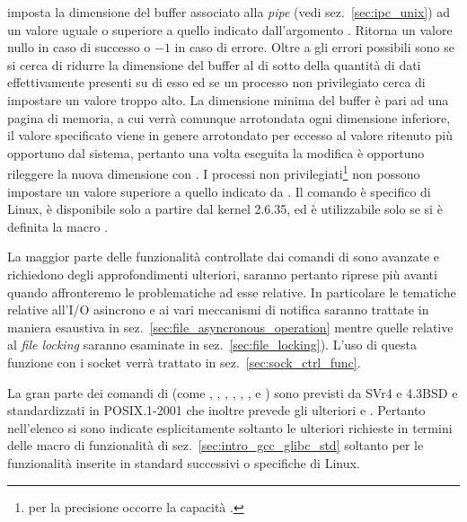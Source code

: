 \begin{basedescript}{\desclabelwidth{1.8cm}}
\item[\constd{F\_SETPIPE\_SZ}] imposta la dimensione del buffer associato alla
  \textit{pipe}  (vedi sez.~\ref{sec:ipc_unix}) ad un valore uguale
  o superiore a quello indicato dall'argomento . Ritorna un valore
  nullo in caso di successo o $-1$ in caso di errore. Oltre a 
  gli errori possibili sono  se si cerca di ridurre la
  dimensione del buffer al di sotto della quantità di dati effettivamente
  presenti su di esso ed  se un processo non privilegiato cerca
  di impostare un valore troppo alto.  La dimensione minima del buffer è pari
  ad una pagina di memoria, a cui verrà comunque arrotondata ogni dimensione
  inferiore, il valore specificato viene in genere arrotondato per eccesso al
  valore ritenuto più opportuno dal sistema, pertanto una volta eseguita la
  modifica è opportuno rileggere la nuova dimensione con
  . I processi non privilegiati\footnote{per la
    precisione occorre la capacità .} non possono
  impostare un valore superiore a quello indicato da
  .  Il comando è specifico di Linux, è
  disponibile solo a partire dal kernel 2.6.35, ed è utilizzabile solo se si è
  definita la macro .

\end{basedescript}


La maggior parte delle funzionalità controllate dai comandi di 
sono avanzate e richiedono degli approfondimenti ulteriori, saranno pertanto
riprese più avanti quando affronteremo le problematiche ad esse relative. In
particolare le tematiche relative all'I/O asincrono e ai vari meccanismi di
notifica saranno trattate in maniera esaustiva in
sez.~\ref{sec:file_asyncronous_operation} mentre quelle relative al
\textit{file locking} saranno esaminate in sez.~\ref{sec:file_locking}). L'uso
di questa funzione con i socket verrà trattato in
sez.~\ref{sec:sock_ctrl_func}.

La gran parte dei comandi di  (come ,
, , , ,
,  e ) sono previsti da SVr4
e 4.3BSD e standardizzati in POSIX.1-2001 che inoltre prevede gli ulteriori
 e . Pertanto nell'elenco si sono indicate
esplicitamente soltanto le ulteriori richieste in termini delle macro di
funzionalità di sez.~\ref{sec:intro_gcc_glibc_std} soltanto per le
funzionalità inserite in standard successivi o specifiche di Linux.


